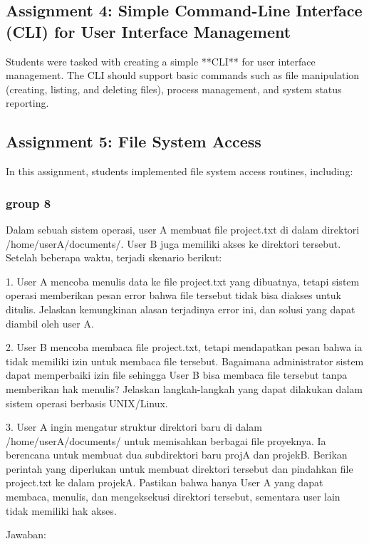 \documentclass[12pt]{article}
\begin{document}
\subsection{Assignment 4: Simple Command-Line Interface (CLI) for User Interface Management}
Students were tasked with creating a simple **CLI** for user interface management. The CLI should support basic commands such as file manipulation (creating, listing, and deleting files), process management, and system status reporting.

\subsection{Assignment 5: File System Access}
In this assignment, students implemented file system access routines, including:
\subsubsection{group 8} 
Dalam sebuah sistem operasi, user A membuat file project.txt di dalam direktori /home/userA/documents/. User B juga memiliki akses ke direktori tersebut. Setelah beberapa waktu, terjadi skenario berikut:

1. User A mencoba menulis data ke file project.txt yang dibuatnya, tetapi sistem operasi memberikan pesan error bahwa file tersebut tidak bisa diakses untuk ditulis. Jelaskan kemungkinan alasan terjadinya error ini, dan solusi yang dapat diambil oleh user A.
   
2. User B mencoba membaca file project.txt, tetapi mendapatkan pesan bahwa ia tidak memiliki izin untuk membaca file tersebut. Bagaimana administrator sistem dapat memperbaiki izin file sehingga User B bisa membaca file tersebut tanpa memberikan hak menulis? Jelaskan langkah-langkah yang dapat dilakukan dalam sistem operasi berbasis UNIX/Linux.

3. User A ingin mengatur struktur direktori baru di dalam /home/userA/documents/ untuk memisahkan berbagai file proyeknya. Ia berencana untuk membuat dua subdirektori baru projA dan projekB. Berikan perintah yang diperlukan untuk membuat direktori tersebut dan pindahkan file project.txt ke dalam projekA. Pastikan bahwa hanya User A yang dapat membaca, menulis, dan mengeksekusi direktori tersebut, sementara user lain tidak memiliki hak akses.

Jawaban:
\end{document}
